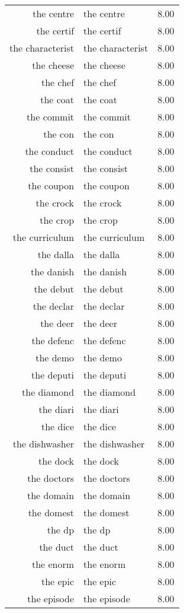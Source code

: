 \begin{table}[ht]
\begin{tabular}{rlr}
  the centre & the centre & 8.00 \\ 
  the certif & the certif & 8.00 \\ 
  the characterist & the characterist & 8.00 \\ 
  the cheese & the cheese & 8.00 \\ 
  the chef & the chef & 8.00 \\ 
  the coat & the coat & 8.00 \\ 
  the commit & the commit & 8.00 \\ 
  the con & the con & 8.00 \\ 
  the conduct & the conduct & 8.00 \\ 
  the consist & the consist & 8.00 \\ 
  the coupon & the coupon & 8.00 \\ 
  the crock & the crock & 8.00 \\ 
  the crop & the crop & 8.00 \\ 
  the curriculum & the curriculum & 8.00 \\ 
  the dalla & the dalla & 8.00 \\ 
  the danish & the danish & 8.00 \\ 
  the debut & the debut & 8.00 \\ 
  the declar & the declar & 8.00 \\ 
  the deer & the deer & 8.00 \\ 
  the defenc & the defenc & 8.00 \\ 
  the demo & the demo & 8.00 \\ 
  the deputi & the deputi & 8.00 \\ 
  the diamond & the diamond & 8.00 \\ 
  the diari & the diari & 8.00 \\ 
  the dice & the dice & 8.00 \\ 
  the dishwasher & the dishwasher & 8.00 \\ 
  the dock & the dock & 8.00 \\ 
  the doctors & the doctors & 8.00 \\ 
  the domain & the domain & 8.00 \\ 
  the domest & the domest & 8.00 \\ 
  the dp & the dp & 8.00 \\ 
  the duct & the duct & 8.00 \\ 
  the enorm & the enorm & 8.00 \\ 
  the epic & the epic & 8.00 \\ 
  the episode & the episode & 8.00 \\ 

\end{tabular}
\end{table}
